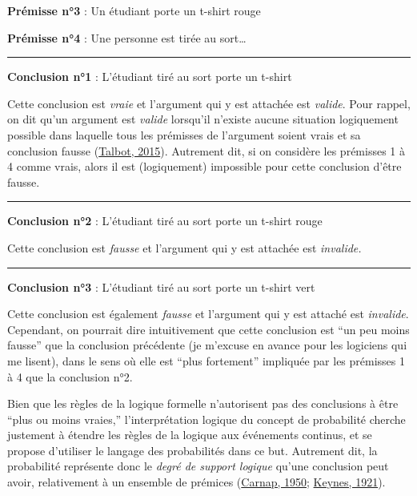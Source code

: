 \documentclass[
  a4paper,11pt,twoside,onecolumn,openright,final,oldfontcommands]{memoir}
\theoremstyle{definition}
\theoremstyle{definition}
\theoremstyle{definition}
\theoremstyle{remark}
\begin{document}
\textbf{Prémisse n°3} : Un étudiant porte un t-shirt rouge

\textbf{Prémisse n°4} : Une personne est tirée au sort\ldots{}

\par

\noindent

\rule{\textwidth}{1pt}

\textbf{Conclusion n°1} : L'étudiant tiré au sort porte un t-shirt

Cette conclusion est \emph{vraie} et l'argument qui y est attachée est \emph{valide}. Pour rappel, on dit qu'un argument est \emph{valide} lorsqu'il n'existe aucune situation logiquement possible dans laquelle tous les prémisses de l'argument soient vrais et sa conclusion fausse (\protect\hyperlink{ref-talbot_critical_2015}{Talbot, 2015}). Autrement dit, si on considère les prémisses 1 à 4 comme vrais, alors il est (logiquement) impossible pour cette conclusion d'être fausse.

\par

\noindent

\rule{\textwidth}{1pt}

\textbf{Conclusion n°2} : L'étudiant tiré au sort porte un t-shirt rouge

Cette conclusion est \emph{fausse} et l'argument qui y est attachée est \emph{invalide.}

\par

\noindent

\rule{\textwidth}{1pt}

\textbf{Conclusion n°3} : L'étudiant tiré au sort porte un t-shirt vert

Cette conclusion est également \emph{fausse} et l'argument qui y est attaché est \emph{invalide}. Cependant, on pourrait dire intuitivement que cette conclusion est ``un peu moins fausse'' que la conclusion précédente (je m'excuse en avance pour les logiciens qui me lisent), dans le sens où elle est ``plus fortement'' impliquée par les prémisses 1 à 4 que la conclusion n°2.

Bien que les règles de la logique formelle n'autorisent pas des conclusions à être ``plus ou moins vraies,'' l'interprétation logique du concept de probabilité cherche justement à étendre les règles de la logique aux événements continus, et se propose d'utiliser le langage des probabilités dans ce but. Autrement dit, la probabilité représente donc le \emph{degré de support logique} qu'une conclusion peut avoir, relativement à un ensemble de prémices (\protect\hyperlink{ref-carnap_logical_1950}{Carnap, 1950}; \protect\hyperlink{ref-keynes_treatise_1921}{Keynes, 1921}).
\end{document}

